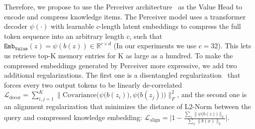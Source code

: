 \documentclass[10pt,twocolumn,letterpaper]{article}
\begin{document}
Therefore, we propose to use the Perceiver architecture~\cite{DBLP:conf/icml/JaegleGBVZC21} as the Value Head to encode and compress knowledge items. The Perceiver model uses a transformer decoder $\psi(\cdot)$ with learnable $c$-length latent embeddings to compress the full token sequence into an arbitrary length $c$, such that $\texttt{Emb}_{\texttt{Value}}(z) =\psi(b(z)) \in \mathbb{R}^{c \times d}$ (In our experiments we use $c=32$).
This lets us retrieve top-K memory entries for K as large as a hundred.
To make the compressed embeddings generated by Perceiver more expressive, we add two additional regularizations. The first one is a disentangled regularization~\cite{DBLP:journals/corr/abs-2205-09797} that forces every two output tokens to be linearly de-correlated $\mathcal{L}_{\text{decor}}=\sum_{i,j=1}^K \Big\lVert \text{Covariance} \big(\psi\big(b(z_i)\big), \psi\big(b(z_j)\big)\big)   \Big\rVert_F^2$, and
the second one is an alignment regularization that minimizes the distance of L2-Norm between the query and compressed knowledge embedding: $\mathcal{L}_{\text{align}} = \bigg \lvert 1 -  \frac{\sum_{z} \lVert \psi\big(b(z) \big) \rVert_2}{\sum_{x} \lVert b(x) \rVert_2}  \bigg \rvert$.
\end{document}
